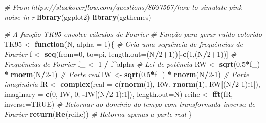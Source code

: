 \documentclass[
]{article}
\newenvironment{Shaded}{\begin{snugshade}}{\end{snugshade}}
\newcommand{\AttributeTok}[1]{\textcolor[rgb]{0.13,0.29,0.53}{#1}}
\newcommand{\CommentTok}[1]{\textcolor[rgb]{0.56,0.35,0.01}{\textit{#1}}}
\newcommand{\ConstantTok}[1]{\textcolor[rgb]{0.56,0.35,0.01}{#1}}
\newcommand{\ControlFlowTok}[1]{\textcolor[rgb]{0.13,0.29,0.53}{\textbf{#1}}}
\newcommand{\DecValTok}[1]{\textcolor[rgb]{0.00,0.00,0.81}{#1}}
\newcommand{\FloatTok}[1]{\textcolor[rgb]{0.00,0.00,0.81}{#1}}
\newcommand{\FunctionTok}[1]{\textcolor[rgb]{0.13,0.29,0.53}{\textbf{#1}}}
\newcommand{\NormalTok}[1]{#1}
\newcommand{\OtherTok}[1]{\textcolor[rgb]{0.56,0.35,0.01}{#1}}
\newcommand{\SpecialCharTok}[1]{\textcolor[rgb]{0.81,0.36,0.00}{\textbf{#1}}}
\begin{document}
\begin{Shaded}
\begin{Highlighting}[]
\CommentTok{\# From https://stackoverflow.com/questions/8697567/how{-}to{-}simulate{-}pink{-}noise{-}in{-}r}
\FunctionTok{library}\NormalTok{(ggplot2)}
\FunctionTok{library}\NormalTok{(ggthemes)}

\CommentTok{\# A função TK95 envolve cálculos de Fourier}
\CommentTok{\# Função para gerar ruído colorido}
\NormalTok{TK95 }\OtherTok{\textless{}{-}} \ControlFlowTok{function}\NormalTok{(N, }\AttributeTok{alpha =} \DecValTok{1}\NormalTok{)\{ }
    \CommentTok{\# Cria uma sequência de frequências de Fourier}
\NormalTok{    f }\OtherTok{\textless{}{-}} \FunctionTok{seq}\NormalTok{(}\AttributeTok{from=}\DecValTok{0}\NormalTok{, }\AttributeTok{to=}\NormalTok{pi, }\AttributeTok{length.out=}\NormalTok{(N}\SpecialCharTok{/}\DecValTok{2}\SpecialCharTok{+}\DecValTok{1}\NormalTok{))[}\SpecialCharTok{{-}}\FunctionTok{c}\NormalTok{(}\DecValTok{1}\NormalTok{,(N}\SpecialCharTok{/}\DecValTok{2}\SpecialCharTok{+}\DecValTok{1}\NormalTok{))] }\CommentTok{\# Frequências de Fourier}
\NormalTok{    f\_ }\OtherTok{\textless{}{-}} \DecValTok{1} \SpecialCharTok{/}\NormalTok{ f}\SpecialCharTok{\^{}}\NormalTok{alpha }\CommentTok{\# Lei de potência}
\NormalTok{    RW }\OtherTok{\textless{}{-}} \FunctionTok{sqrt}\NormalTok{(}\FloatTok{0.5}\SpecialCharTok{*}\NormalTok{f\_) }\SpecialCharTok{*} \FunctionTok{rnorm}\NormalTok{(N}\SpecialCharTok{/}\DecValTok{2{-}1}\NormalTok{) }\CommentTok{\# Parte real}
\NormalTok{    IW }\OtherTok{\textless{}{-}} \FunctionTok{sqrt}\NormalTok{(}\FloatTok{0.5}\SpecialCharTok{*}\NormalTok{f\_) }\SpecialCharTok{*} \FunctionTok{rnorm}\NormalTok{(N}\SpecialCharTok{/}\DecValTok{2{-}1}\NormalTok{) }\CommentTok{\# Parte imaginária}
\NormalTok{    fR }\OtherTok{\textless{}{-}} \FunctionTok{complex}\NormalTok{(}\AttributeTok{real =} \FunctionTok{c}\NormalTok{(}\FunctionTok{rnorm}\NormalTok{(}\DecValTok{1}\NormalTok{), RW, }\FunctionTok{rnorm}\NormalTok{(}\DecValTok{1}\NormalTok{), RW[(N}\SpecialCharTok{/}\DecValTok{2{-}1}\NormalTok{)}\SpecialCharTok{:}\DecValTok{1}\NormalTok{]), }
                  \AttributeTok{imaginary =} \FunctionTok{c}\NormalTok{(}\DecValTok{0}\NormalTok{, IW, }\DecValTok{0}\NormalTok{, }\SpecialCharTok{{-}}\NormalTok{IW[(N}\SpecialCharTok{/}\DecValTok{2{-}1}\NormalTok{)}\SpecialCharTok{:}\DecValTok{1}\NormalTok{]), }\AttributeTok{length.out=}\NormalTok{N)}
\NormalTok{    reihe }\OtherTok{\textless{}{-}} \FunctionTok{fft}\NormalTok{(fR, }\AttributeTok{inverse=}\ConstantTok{TRUE}\NormalTok{) }\CommentTok{\# Retornar ao domínio do tempo com transformada inversa de Fourier}
    \FunctionTok{return}\NormalTok{(}\FunctionTok{Re}\NormalTok{(reihe)) }\CommentTok{\# Retorna apenas a parte real}
\NormalTok{\}}


\end{Highlighting}
\end{Shaded}
\end{document}
